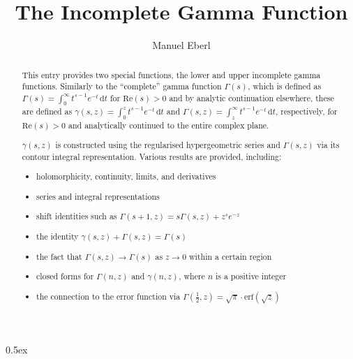 \documentclass[11pt,a4paper]{article}
\begin{document}
\title{The Incomplete Gamma Function}
\author{Manuel Eberl}
\maketitle

\begin{abstract}
This entry provides two special functions, the lower and upper incomplete gamma functions.
Similarly to the ``complete'' gamma function $\Gamma(s)$, which is defined as 
$\Gamma(s) = \int_0^\infty t^{s-1}e^{-t}\,\text{d}t$ for $\text{Re}(s)>0$ and by
analytic continuation elsewhere, these are defined as
$\gamma(s,z) = \int_0^z t^{s-1}e^{-t}\,\text{d}t$ and
$\Gamma(s,z) = \int_z^\infty t^{s-1}e^{-t}\,\text{d}t$, respectively, for $\text{Re}(s)>0$
and analytically continued to the entire complex plane.

$\gamma(s,z)$ is constructed using the regularised hypergeometric series and $\Gamma(s,z)$ via 
its contour integral representation. Various results are provided, including:
\begin{itemize}
\item holomorphicity, continuity, limits, and derivatives
\item series and integral representations
\item shift identities such as $\Gamma(s+1, z) = s\Gamma(s,z) + z^s e^{-z}$
\item the identity $\gamma(s,z) + \Gamma(s,z) = \Gamma(s)$
\item the fact that $\Gamma(s,z) \to \Gamma(s)$ as $z\to 0$ within a certain region
\item closed forms for $\Gamma(n,z)$ and $\gamma(n,z)$, where $n$ is a positive integer
\item the connection to the error function via $\Gamma(\frac{1}{2}, z) = \sqrt{\pi}\cdot\text{erf}(\sqrt{z})$
\end{itemize}
\end{abstract}

\tableofcontents

\newpage
\parindent 0pt\parskip 0.5ex



\raggedright



\end{document}
